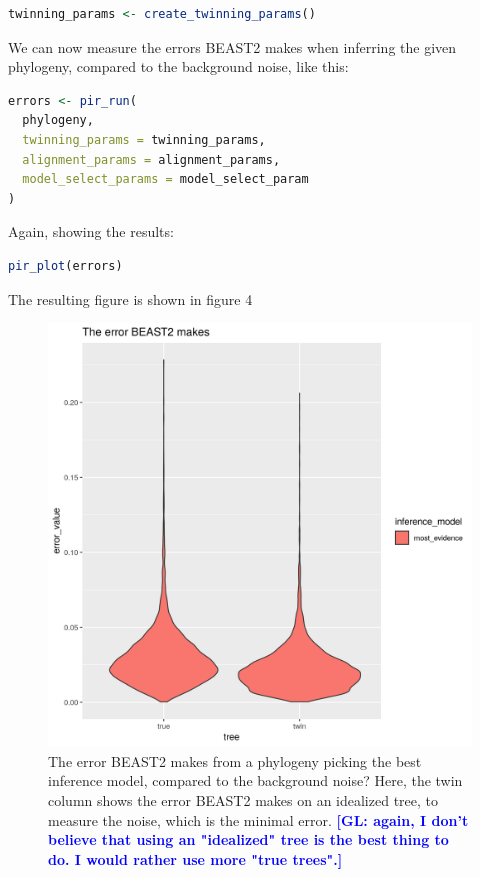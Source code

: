 \documentclass{article}
\newcommand{\giovanni}[1]{\textcolor{blue}{\textbf{[GL: #1]}}}
\begin{document}
\begin{lstlisting}[language=R, floatplacement=H, frame=single]
twinning_params <- create_twinning_params()
\end{lstlisting}

We can now measure the errors BEAST2
makes when inferring the given phylogeny, compared
to the background noise, like this:

\begin{lstlisting}[language=R, floatplacement=H, frame=single]
errors <- pir_run(
  phylogeny,
  twinning_params = twinning_params,
  alignment_params = alignment_params,
  model_select_params = model_select_param
)
\end{lstlisting}

Again, showing the results:

\begin{lstlisting}[language=R, floatplacement=H, frame=single]
pir_plot(errors)
\end{lstlisting}

The resulting figure is shown in figure 4

\begin{figure}[h]
  \includegraphics[width=\textwidth]{figure_4.png}
  \caption{
    The error BEAST2 makes from a phylogeny 
    picking the best inference model, compared to the background noise?
    Here, the twin column shows the error BEAST2 makes on an idealized
    tree, to measure the noise, which is the minimal error. \giovanni{again, I don't believe that using an "idealized" tree is the best thing to do. I would rather use more "true trees".}
  }
\end{figure}
\end{document}
